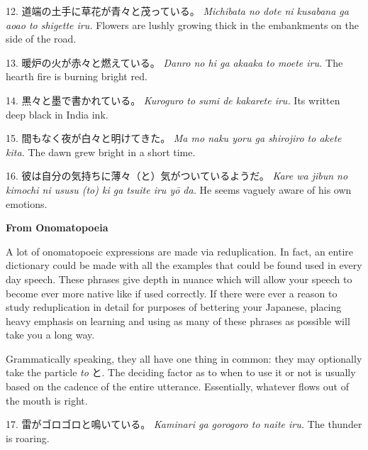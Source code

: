 \par{12. 道端の土手に草花が青々と茂っている。 \hfill\break
 \emph{Michibata no dote ni kusabana ga aoao to shigette iru. }\hfill\break
Flowers are lushly growing thick in the embankments on the side of the road. }

\par{13. 暖炉の火が赤々と燃えている。 \hfill\break
 \emph{Danro no hi ga aka\textquotesingle aka to moete iru. \hfill\break
 }The hearth fire is burning bright red. }

\par{14. 黒々と墨で書かれている。 \hfill\break
 \emph{Kuroguro to sumi de kakarete iru. \hfill\break
 }It\textquotesingle s written deep black in India ink. }

\par{15. 間もなく夜が白々と明けてきた。 \hfill\break
 \emph{Ma mo naku yoru ga shirojiro to akete kita. }\hfill\break
The dawn grew bright in a short time. }

\par{16. 彼は自分の気持ちに薄々（と）気がついているようだ。 \hfill\break
 \emph{Kare wa jibun no kimochi ni ususu (to) ki ga tsuite iru yō da. \hfill\break
 }He seems vaguely aware of his own emotions. }

\begin{center}
\textbf{From Onomatopoeia }
\end{center}

\par{ A lot of onomatopoeic expressions are made via reduplication. In fact, an entire dictionary could be made with all the examples that could be found used in every day speech. These phrases give depth in nuance which will allow your speech to become ever more native like if used correctly. If there were ever a reason to study reduplication in detail for purposes of bettering your Japanese, placing heavy emphasis on learning and using as many of these phrases as possible will take you a long way. }

\par{ Grammatically speaking, they all have one thing in common: they may optionally take the particle \emph{to }と. The deciding factor as to when to use it or not is usually based on the cadence of the entire utterance. Essentially, whatever flows out of the mouth is right. }

\par{17. 雷がゴロゴロと鳴いている。 \hfill\break
 \emph{Kaminari ga gorogoro to naite iru. }\hfill\break
The thunder is roaring. }

